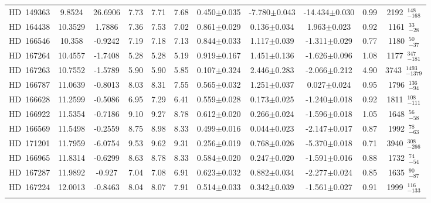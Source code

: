 {\begin{longtable}{lcccccccccc}
\noalign{\smallskip}
HD~149363 & 9.8524 & 26.6906 & 7.73 & 7.71 & 7.68 & 0.450$\pm$0.035 & -7.780$\pm$0.043 & -14.434$\pm$0.030 & 0.99 & 2192~$_{-168}^{148}$ \\
\noalign{\smallskip}
HD~164438 & 10.3529 & 1.7886 & 7.36 & 7.53 & 7.02 & 0.861$\pm$0.029 & 0.136$\pm$0.034 & 1.963$\pm$0.023 & 0.92 & 1161~$_{-28}^{33}$ \\
\noalign{\smallskip}
HD~166546 & 10.358 & -0.9242 & 7.19 & 7.18 & 7.13 & 0.844$\pm$0.033 & 1.117$\pm$0.039 & -1.311$\pm$0.029 & 0.77 & 1180~$_{-37}^{50}$ \\
\noalign{\smallskip}
HD~167264 & 10.4557 & -1.7408 & 5.28 & 5.28 & 5.19 & 0.919$\pm$0.167 & 1.451$\pm$0.136 & -1.626$\pm$0.096 & 1.08 & 1177~$_{-181}^{347}$ \\
\noalign{\smallskip}
HD~167263 & 10.7552 & -1.5789 & 5.90 & 5.90 & 5.85 & 0.107$\pm$0.324 & 2.446$\pm$0.283 & -2.066$\pm$0.212 & 4.90 & 3743~$_{-1379}^{1493}$ \\
\noalign{\smallskip}
HD~166787 & 11.0639 & -0.8013 & 8.03 & 8.31 & 7.55 & 0.565$\pm$0.032 & 1.251$\pm$0.037 & 0.027$\pm$0.024 & 0.95 & 1796~$_{-94}^{136}$ \\
\noalign{\smallskip}
HD~166628 & 11.2599 & -0.5086 & 6.95 & 7.29 & 6.41 & 0.559$\pm$0.028 & 0.173$\pm$0.025 & -1.240$\pm$0.018 & 0.92 & 1811~$_{-111}^{108}$ \\
\noalign{\smallskip}
HD~166922 & 11.5354 & -0.7186 & 9.10 & 9.27 & 8.78 & 0.612$\pm$0.020 & 0.266$\pm$0.024 & -1.596$\pm$0.018 & 1.05 & 1648~$_{-58}^{56}$ \\
\noalign{\smallskip}
HD~166569 & 11.5498 & -0.2559 & 8.75 & 8.98 & 8.33 & 0.499$\pm$0.016 & 0.044$\pm$0.023 & -2.147$\pm$0.017 & 0.87 & 1992~$_{-63}^{78}$ \\
\noalign{\smallskip}
HD~171201 & 11.7959 & -6.0754 & 9.53 & 9.62 & 9.31 & 0.256$\pm$0.019 & 0.768$\pm$0.026 & -5.370$\pm$0.018 & 0.71 & 3940~$_{-266}^{308}$ \\
\noalign{\smallskip}
HD~166965 & 11.8314 & -0.6299 & 8.63 & 8.78 & 8.33 & 0.584$\pm$0.020 & 0.247$\pm$0.020 & -1.591$\pm$0.016 & 0.88 & 1732~$_{-54}^{74}$ \\
\noalign{\smallskip}
HD~167287 & 11.9892 & -0.927 & 7.04 & 7.08 & 6.91 & 0.623$\pm$0.032 & 0.882$\pm$0.034 & -2.277$\pm$0.024 & 0.85 & 1635~$_{-87}^{90}$ \\
\noalign{\smallskip}
HD~167224 & 12.0013 & -0.8463 & 8.04 & 8.07 & 7.91 & 0.514$\pm$0.033 & 0.342$\pm$0.039 & -1.561$\pm$0.027 & 0.91 & 1999~$_{-133}^{116}$ \\
\noalign{\smallskip}

\end{longtable}}
